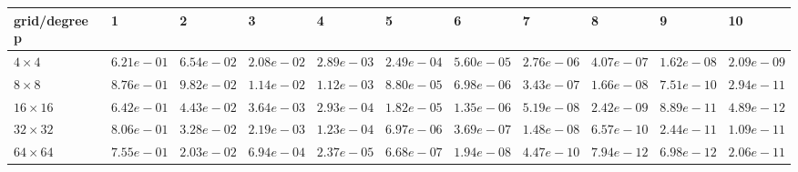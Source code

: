 \begin{tabular}{lllllllllll}
\hline
 grid/degree p   & 1          & 2          & 3          & 4          & 5          & 6          & 7          & 8          & 9          & 10         \\
\hline
 $4 \times 4$    & $6.21e-01$ & $6.54e-02$ & $2.08e-02$ & $2.89e-03$ & $2.49e-04$ & $5.60e-05$ & $2.76e-06$ & $4.07e-07$ & $1.62e-08$ & $2.09e-09$ \\
 $8 \times 8$    & $8.76e-01$ & $9.82e-02$ & $1.14e-02$ & $1.12e-03$ & $8.80e-05$ & $6.98e-06$ & $3.43e-07$ & $1.66e-08$ & $7.51e-10$ & $2.94e-11$ \\
 $16 \times 16$  & $6.42e-01$ & $4.43e-02$ & $3.64e-03$ & $2.93e-04$ & $1.82e-05$ & $1.35e-06$ & $5.19e-08$ & $2.42e-09$ & $8.89e-11$ & $4.89e-12$ \\
 $32 \times 32$  & $8.06e-01$ & $3.28e-02$ & $2.19e-03$ & $1.23e-04$ & $6.97e-06$ & $3.69e-07$ & $1.48e-08$ & $6.57e-10$ & $2.44e-11$ & $1.09e-11$ \\
 $64 \times 64$  & $7.55e-01$ & $2.03e-02$ & $6.94e-04$ & $2.37e-05$ & $6.68e-07$ & $1.94e-08$ & $4.47e-10$ & $7.94e-12$ & $6.98e-12$ & $2.06e-11$ \\
\hline
\end{tabular}